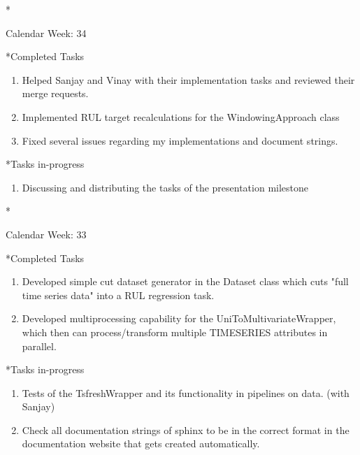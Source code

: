 \documentclass[11pt,a4paper]{article}
\begin{document}
\newpage
\begin{section}*{Calendar Week: 34 \hfill \date{27 August, 2021}}
	
	\begin{subsection}*{Completed Tasks}
		\begin{enumerate}
			\item Helped Sanjay and Vinay with their implementation tasks and reviewed their merge requests.
			\item Implemented RUL target recalculations for the WindowingApproach class
			\item Fixed several issues regarding my implementations and document strings.
		\end{enumerate}
	\end{subsection}
	
		\begin{subsection}*{Tasks in-progress}
		\begin{enumerate}
			\item Discussing and distributing the tasks of the presentation milestone
		\end{enumerate}
	\end{subsection}
	
\end{section}

\newpage
\begin{section}*{Calendar Week: 33 \hfill \date{20 August, 2021}}
	
	\begin{subsection}*{Completed Tasks}
		\begin{enumerate}
			\item Developed simple cut dataset generator in the Dataset class which cuts "full time series data" into a RUL regression task.
			\item Developed multiprocessing capability for the UniToMultivariateWrapper, which then can process/transform multiple TIMESERIES attributes in parallel.
		\end{enumerate}
	\end{subsection}
	
	\begin{subsection}*{Tasks in-progress}
		\begin{enumerate}
			\item Tests of the TsfreshWrapper and its functionality in pipelines on data. (with Sanjay)
			\item Check all documentation strings of sphinx to be in the correct format in the documentation website that gets created automatically.
		\end{enumerate}
	\end{subsection}
	
\end{section}
\end{document}
